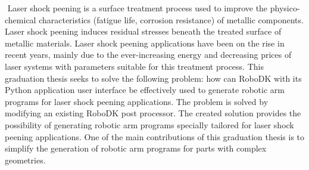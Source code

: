﻿%
﻿
Laser shock peening is a surface treatment process used to improve the physico-chemical characteristics (fatigue life, corrosion resistance) of metallic components. Laser shock peening induces residual stresses beneath the treated surface of metallic materials. Laser shock peening applications have been on the rise in recent years, mainly due to the ever-increasing energy and decreasing prices of laser systems with parameters suitable for this treatment process. This graduation thesis seeks to solve the following problem: how can RoboDK with its Python application user interface be effectively used to generate robotic arm programs for laser shock peening applications. The problem is solved by modifying an existing RoboDK post processor. The created solution provides the possibility of generating robotic arm programs specially tailored for laser shock peening applications. One of the main contributions of this graduation thesis is to simplify the generation of robotic arm programs for parts with complex geometries.



